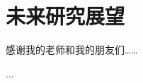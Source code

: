 \documentclass[lang=chs, degree=master, blindreview=false, adobe=false]{yanputhesis}
\begin{document}
\section{未来研究展望}

\cleardoublepage
\appendix

\backmatter                                                 %
\begin{acknowledgements}                                    %
    感谢我的老师和我的朋友们……
\end{acknowledgements}                                      %
\begin{accomplishments}                                     %
    [1] ...
\end{accomplishments}                                       %
\makestatement                                              %
\end{document}
